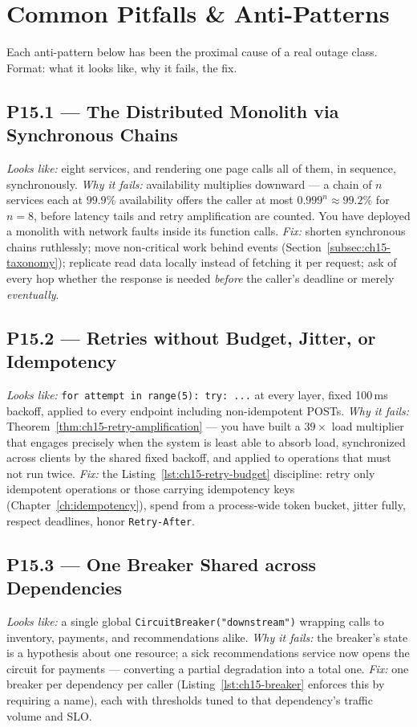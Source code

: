 \section{Common Pitfalls \& Anti-Patterns}
\label{sec:ch15-pitfalls}

Each anti-pattern below has been the proximal cause of a real outage class.
Format: what it looks like, why it fails, the fix.

\subsection*{P15.1 --- The Distributed Monolith via Synchronous Chains}
\emph{Looks like:} eight services, and rendering one page calls all of
them, in sequence, synchronously. \emph{Why it fails:} availability
multiplies downward --- a chain of $n$ services each at $99.9\%$
availability offers the caller at most $0.999^n \approx 99.2\%$ for
$n = 8$, before latency tails and retry amplification are counted. You have
deployed a monolith with network faults inside its function calls.
\emph{Fix:} shorten synchronous chains ruthlessly; move non-critical work
behind events (Section~\ref{subsec:ch15-taxonomy}); replicate read data
locally instead of fetching it per request; ask of every hop whether the
response is needed \emph{before} the caller's deadline or merely
\emph{eventually}.

\subsection*{P15.2 --- Retries without Budget, Jitter, or Idempotency}
\emph{Looks like:} \texttt{for attempt in range(5): try: ...} at every
layer, fixed 100\,ms backoff, applied to every endpoint including
non-idempotent POSTs. \emph{Why it fails:}
Theorem~\ref{thm:ch15-retry-amplification} --- you have built a $39\times$
load multiplier that engages precisely when the system is least able to
absorb load, synchronized across clients by the shared fixed backoff, and
applied to operations that must not run twice. \emph{Fix:} the
Listing~\ref{lst:ch15-retry-budget} discipline: retry only idempotent
operations or those carrying idempotency keys
(Chapter~\ref{ch:idempotency}), spend from a process-wide token bucket,
jitter fully, respect deadlines, honor \texttt{Retry-After}.

\subsection*{P15.3 --- One Breaker Shared across Dependencies}
\emph{Looks like:} a single global \texttt{CircuitBreaker("downstream")}
wrapping calls to inventory, payments, and recommendations alike.
\emph{Why it fails:} the breaker's state is a hypothesis about one
resource; a sick recommendations service now opens the circuit for payments
--- converting a partial degradation into a total one. \emph{Fix:} one
breaker per dependency per caller (Listing~\ref{lst:ch15-breaker} enforces
this by requiring a name), each with thresholds tuned to that dependency's
traffic volume and SLO.

